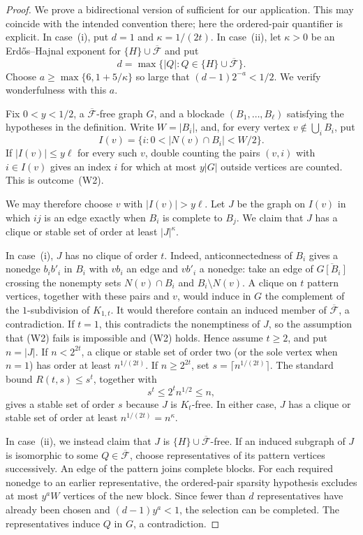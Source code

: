 \documentclass[11pt]{article}
\numberwithin{equation}{section}
\theoremstyle{plain}
\theoremstyle{definition}
\begin{document}
\begin{proof}
We prove a bidirectional version of
\cite[Lemma~2.1]{HuangJuZhou2026} sufficient for our application.  This
may coincide with the intended convention there; here the ordered-pair
quantifier is explicit.  In case~(i), put
$d=1$ and
$\kappa=1/(2t)$.  In case~(ii), let $\kappa>0$ be an
Erd\H{o}s--Hajnal exponent for
$\{H\}\cup\overline{\mathcal F}$ and put
\[
 d=\max\{|Q|:Q\in\{H\}\cup\overline{\mathcal F}\}.
\]
Choose $a\geq\max\{6,1+5/\kappa\}$ so large that
$(d-1)2^{-a}<1/2$.  We verify wonderfulness with this $a$.

Fix $0<y<1/2$, a $\overline{\mathcal F}$-free graph $G$, and a
blockade $(B_1,\ldots,B_\ell)$ satisfying the hypotheses in the
definition.  Write $W=|B_i|$, and, for every vertex
$v\notin\bigcup_iB_i$, put
\[
 I(v)=\{i:0<|N(v)\cap B_i|<W/2\}.
\]
If $|I(v)|\leq y\ell$ for every such $v$, double counting the pairs
$(v,i)$ with $i\in I(v)$ gives an index $i$ for which at most
$y|G|$ outside vertices are counted.  This is outcome~(W2).

We may therefore choose $v$ with $|I(v)|>y\ell$.  Let $J$ be the
graph on $I(v)$ in which $ij$ is an edge exactly when $B_i$ is
complete to $B_j$.  We claim that $J$ has a clique or stable set of
order at least $|J|^\kappa$.

In case~(i), $J$ has no clique of order $t$.  Indeed,
anticonnectedness of $B_i$ gives a nonedge $b_ib'_i$ in $B_i$ with
$vb_i$ an edge and $vb'_i$ a nonedge: take an edge of
$\overline{G[B_i]}$ crossing the nonempty sets $N(v)\cap B_i$ and
$B_i\setminus N(v)$.  A clique on $t$ pattern vertices, together with
these pairs and $v$, would induce in $G$ the complement of the
$1$-subdivision of $K_{1,t}$.  It would therefore contain an induced
member of $\overline{\mathcal F}$, a contradiction.  If $t=1$, this
contradicts the nonemptiness of $J$, so the assumption that (W2) fails
is impossible and (W2) holds.  Hence assume $t\geq2$, and put
$n=|J|$.  If $n<2^{2t}$, a clique or stable set of order two (or the sole
vertex when $n=1$) has order at least $n^{1/(2t)}$.  If
$n\geq2^{2t}$, set $s=\lceil n^{1/(2t)}\rceil$.  The standard bound
$R(t,s)\leq s^t$, together with
\[
                 s^t\leq2^t n^{1/2}\leq n,
\]
gives a stable set of order $s$ because $J$ is $K_t$-free.  In either
case, $J$ has a clique or stable set of order at least
$n^{1/(2t)}=n^\kappa$.

In case~(ii), we instead claim that $J$ is
$\{H\}\cup\overline{\mathcal F}$-free.  If an induced subgraph of $J$
is isomorphic to some $Q\in\overline{\mathcal F}$, choose
representatives of its pattern vertices successively.  An edge of the
pattern joins complete blocks.  For each required nonedge to an earlier
representative, the ordered-pair sparsity hypothesis excludes at most
$y^aW$ vertices of the new block.  Since fewer than $d$
representatives have already been chosen and $(d-1)y^a<1$, the
selection can be completed.  The representatives induce $Q$ in $G$,
a contradiction.


\end{proof}
\end{document}
